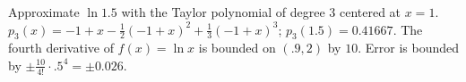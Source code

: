 {Approximate $\ln1.5$ with the Taylor polynomial of degree 3 centered at $x=1$.
}
{$p_3(x) =-1+x-\frac{1}{2} (-1+x)^2+\frac{1}{3} (-1+x)^3$; $p_3(1.5) =  0.41667$. The fourth derivative of $f(x) =\ln x$ is bounded on $(.9,2)$ by $10$. Error is bounded by $\pm \frac{10}{4!}\cdot.5^4 = \pm 0.026.$
}